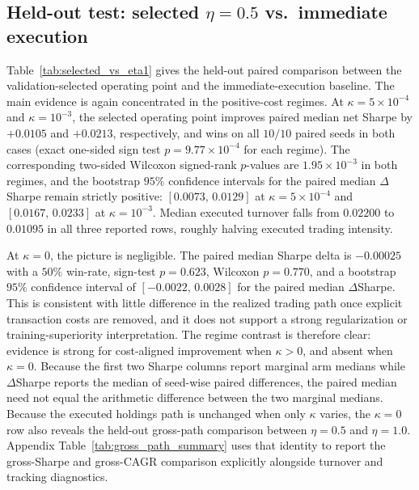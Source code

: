 \documentclass[10pt,twocolumn]{article}
\newcommand{\kappaTC}{\kappa}
\begin{document}
\subsection{Held-out test: selected \texorpdfstring{$\eta=0.5$}{eta=0.5} vs.\ immediate execution}
Table~\ref{tab:selected_vs_eta1} gives the held-out paired comparison between the validation-selected operating point and the immediate-execution baseline. The main evidence is again concentrated in the positive-cost regimes. At $\kappa=5\times10^{-4}$ and $\kappa=10^{-3}$, the selected operating point improves paired median net Sharpe by $+0.0105$ and $+0.0213$, respectively, and wins on all $10/10$ paired seeds in both cases (exact one-sided sign test $p=9.77\times10^{-4}$ for each regime). The corresponding two-sided Wilcoxon signed-rank $p$-values are $1.95\times10^{-3}$ in both regimes, and the bootstrap $95\%$ confidence intervals for the paired median $\Delta$Sharpe remain strictly positive: $[0.0073,\,0.0129]$ at $\kappa=5\times10^{-4}$ and $[0.0167,\,0.0233]$ at $\kappa=10^{-3}$. Median executed turnover falls from $0.02200$ to $0.01095$ in all three reported rows, roughly halving executed trading intensity.

At $\kappa=0$, the picture is negligible. The paired median Sharpe delta is $-0.00025$ with a $50\%$ win-rate, sign-test $p=0.623$, Wilcoxon $p=0.770$, and a bootstrap $95\%$ confidence interval of $[-0.0022,\,0.0028]$ for the paired median $\Delta$Sharpe. This is consistent with little difference in the realized trading path once explicit transaction costs are removed, and it does not support a strong regularization or training-superiority interpretation. The regime contrast is therefore clear: evidence is strong for cost-aligned improvement when $\kappaTC>0$, and absent when $\kappaTC=0$. Because the first two Sharpe columns report marginal arm medians while $\Delta$Sharpe reports the median of seed-wise paired differences, the paired median need not equal the arithmetic difference between the two marginal medians. Because the executed holdings path is unchanged when only $\kappa$ varies, the $\kappa=0$ row also reveals the held-out gross-path comparison between $\eta=0.5$ and $\eta=1.0$. Appendix Table~\ref{tab:gross_path_summary} uses that identity to report the gross-Sharpe and gross-CAGR comparison explicitly alongside turnover and tracking diagnostics.
\end{document}
